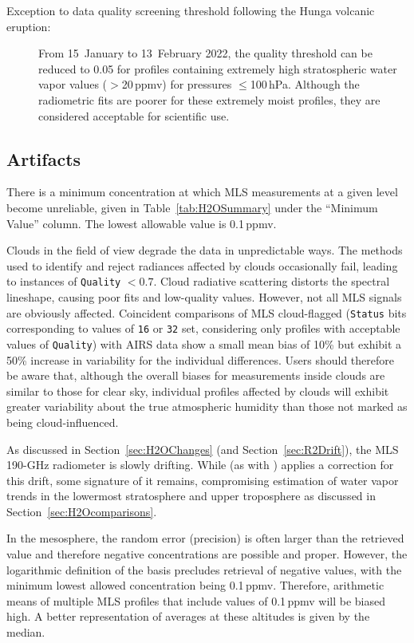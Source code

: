 \begin{nofloatpages}
\begin{description}
  \item[Exception to data quality screening threshold following the Hunga volcanic eruption:] From 15~January to 13~February 2022, the quality threshold can be reduced to 0.05 for profiles containing extremely high stratospheric water vapor values ($>$20\,ppmv) for pressures $\le$100\,hPa. Although the radiometric fits are poorer for these extremely moist profiles, they are considered acceptable for scientific use.
\end{description}
\end{nofloatpages}

\subsection{Artifacts}
\label{sec:H2Oartifacts}

There is a minimum concentration at which MLS  measurements at a given level become unreliable, given in Table~\ref{tab:H2OSummary} under the ``Minimum Value'' column. The lowest allowable  value is 0.1\,ppmv.

Clouds in the field of view degrade the data in unpredictable ways. The methods used to identify and reject radiances affected by clouds occasionally fail, leading to instances of \texttt{Quality} $<0.7$. Cloud radiative scattering distorts the spectral lineshape, causing poor fits and low-quality values. However, not all MLS signals are obviously affected. Coincident comparisons of MLS cloud-flagged  (\texttt{Status} bits corresponding to values of \texttt{16} or \texttt{32} set, considering only profiles with acceptable values of \texttt{Quality}) with AIRS data show a small mean bias of 10\% but exhibit a 50\% increase in variability for the individual differences. Users should therefore be aware that, although the overall biases for measurements inside clouds are similar to those for clear sky, individual profiles affected by clouds will exhibit greater variability about the true atmospheric humidity than those not marked as being cloud-influenced.

As discussed in Section~\ref{sec:H2OChanges} (and Section~\ref{sec:R2Drift}), the MLS 190\nobreakdash-GHz radiometer is slowly drifting.  While \thisv (as with \prevv) applies a correction for this drift, some signature of it remains, compromising estimation of water vapor trends in the lowermost stratosphere and upper troposphere as discussed in Section~\ref{sec:H2Ocomparisons}.

In the mesosphere, the random error (precision) is often larger than the retrieved value and therefore negative concentrations are possible and proper. However, the logarithmic definition of the  basis precludes retrieval of negative values, with the minimum lowest allowed concentration being 0.1\,ppmv. Therefore, arithmetic means of multiple MLS  profiles that include values of 0.1\,ppmv will be biased high. A better representation of averages at these altitudes is given by the median.

